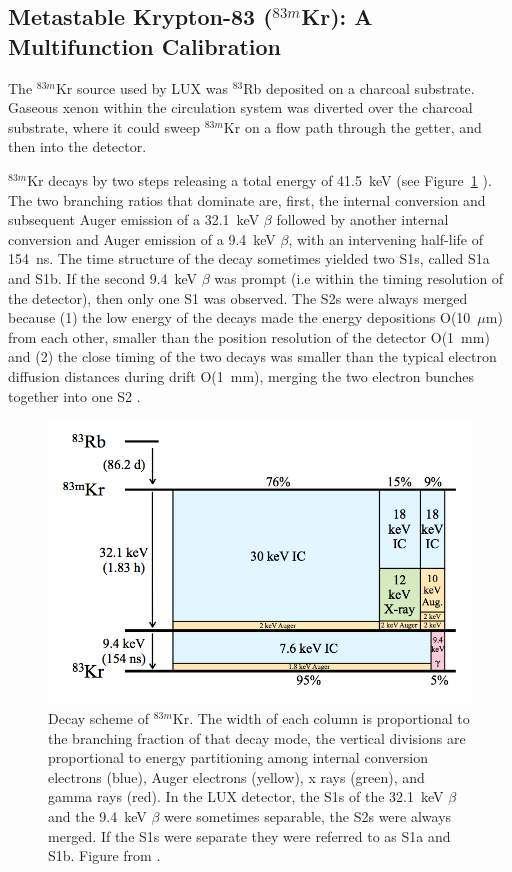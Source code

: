 \subsection{Metastable Krypton-83 ($^{83m}$Kr): A Multifunction Calibration}
\label{sec:krypton}
The $^{83m}$Kr source used by \ac{LUX} was $^{83}$Rb deposited on a charcoal substrate. Gaseous xenon within the circulation system was diverted over the charcoal substrate, where it could sweep $^{83m}$Kr on a flow path through the getter, and then into the detector. 

$^{83m}$Kr decays by two steps releasing a total energy of 41.5~keV (see Figure~\ref{fig:kr_decay} ). The two branching ratios that dominate are, first, the internal conversion and subsequent Auger emission of a 32.1~keV $\beta$ followed by another internal conversion and Auger emission of a 9.4~keV $\beta$, with an intervening half-life of 154~ns. The time structure of the decay sometimes yielded two S1s, called S1a and S1b. If the second 9.4~keV $\beta$ was prompt (i.e within the timing resolution of the detector), then only one S1 was observed. The S2s were always merged because (1) the low energy of the decays made the energy depositions O(10~$\mu$m) from each other, smaller than the position resolution of the detector O(1~mm) and (2) the close timing of the two decays was smaller than the typical electron diffusion distances during drift O(1~mm), merging the two electron bunches together into one S2 \cite{LUXKr}.

\begin{figure}[htbp]
\begin{center}
\includegraphics[width=\textwidth]{figures/lux/kr_decay.png}
\caption{ Decay scheme of $^{83m}$Kr. The width of each column is proportional to the branching fraction of that decay mode, the vertical divisions are proportional to energy partitioning among internal conversion electrons (blue), Auger electrons (yellow), x rays (green), and gamma rays (red). In the \acs{LUX} detector, the S1s of the 32.1~keV $\beta$ and the 9.4~keV $\beta$ were sometimes separable, the S2s were always merged. If the S1s were separate they were referred to as S1a and S1b. Figure from \cite{LUXKr}.}
\label{fig:kr_decay}
\end{center}
\end{figure}


